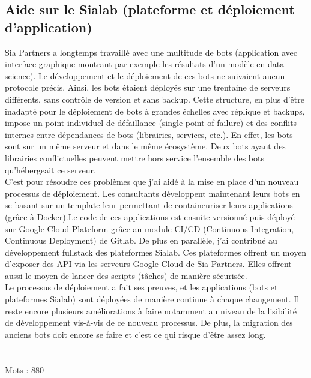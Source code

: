 \documentclass{article} %
\begin{document}
\subsection{Aide sur le Sialab (plateforme et déploiement d'application)}
Sia Partners a longtemps travaillé avec une multitude de bots (application avec interface graphique montrant par exemple les résultats d'un modèle en data science). Le développement et le déploiement de ces bots ne suivaient aucun protocole précis. Ainsi, les bots étaient déployés sur une trentaine de serveurs différents, sans contrôle de version et sans backup. Cette structure, en plus d'être inadapté pour le déploiement de bots à grandes échelles avec réplique et backups, impose un point individuel de défaillance (single point of failure) et des conflits internes entre dépendances de bots (librairies, services, etc.). En effet, les bots sont sur un même serveur et dans le même écosystème. Deux bots ayant des librairies conflictuelles peuvent mettre hors service l'ensemble des bots qu'hébergeait ce serveur.\\
C'est pour résoudre ces problèmes que j'ai aidé à la mise en place d'un nouveau processus de déploiement. Les consultants développent maintenant leurs bots en se basant sur un template leur permettant de containeuriser leurs applications (grâce à Docker).Le code de ces applications est ensuite versionné puis déployé sur Google Cloud Plateform grâce au module CI/CD (Continuous Integration, Continuous Deployment) de Gitlab. De plus en parallèle, j'ai contribué au développement fullstack des plateformes Sialab. Ces plateformes offrent un moyen d'exposer des API via les serveurs Google Cloud de Sia Partners. Elles offrent aussi le moyen de lancer des scripts (tâches) de manière sécurisée.\\
Le processus de déploiement a fait ses preuves, et les applications (bots et plateformes Sialab) sont déployées de manière continue à chaque changement. Il reste encore plusieurs améliorations à faire notamment au niveau de la lisibilité de développement vis-à-vis de ce nouveau processus. De plus, la migration des anciens bots doit encore se faire et c'est ce qui risque d'être assez long.  \\ \\ \\
Mots : 880
\end{document}
